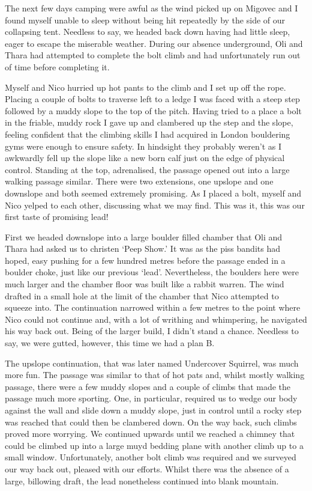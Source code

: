 The next few days camping were awful as the wind picked up on Migovec
and I found myself unable to sleep without being hit repeatedly by the
side of our collapsing tent. Needless to say, we headed back down having
had little sleep, eager to escape the miserable weather. During our
absence underground, Oli and Thara had attempted to complete the bolt
climb and had unfortunately run out of time before completing it.

Myself and Nico hurried up hot pants to the climb and I set up off the
rope. Placing a couple of bolts to traverse left to a ledge I was faced
with a steep step followed by a muddy slope to the top of the pitch.
Having tried to a place a bolt in the friable, muddy rock I gave up and
clambered up the step and the slope, feeling confident that the climbing
skills I had acquired in London bouldering gyms were enough to ensure
safety. In hindsight they probably weren't as I awkwardly fell up the
slope like a new born calf just on the edge of physical control.
Standing at the top, adrenalised, the passage opened out into a large
walking passage similar. There were two extensions, one upslope and one
downslope and both seemed extremely promising. As I placed a bolt,
myself and Nico yelped to each other, discussing what we may find. This
was it, this was our first taste of promising lead!

First we headed downslope into a large boulder filled chamber that Oli
and Thara had asked us to christen `Peep Show.' It was as the piss
bandits had hoped, easy pushing for a few hundred metres before the
passage ended in a boulder choke, just like our previous `lead'.
Nevertheless, the boulders here were much larger and the chamber floor
was built like a rabbit warren. The wind drafted in a small hole at the
limit of the chamber that Nico attempted to squeeze into. The
continuation narrowed within a few metres to the point where Nico could
not continue and, with a lot of writhing and whimpering, he navigated
his way back out. Being of the larger build, I didn't stand a chance.
Needless to say, we were gutted, however, this time we had a plan B.

The upslope continuation, that was later named Undercover Squirrel, was
much more fun. The passage was similar to that of hot pats and, whilst
mostly walking passage, there were a few muddy slopes and a couple of
climbs that made the passage much more sporting. One, in particular,
required us to wedge our body against the wall and slide down a muddy
slope, just in control until a rocky step was reached that could then be
clambered down. On the way back, such climbs proved more worrying. We
continued upwards until we reached a chimney that could be climbed up
into a large muyd bedding plane with another climb up to a small window.
Unfortunately, another bolt climb was required and we surveyed our way
back out, pleased with our efforts. Whilst there was the absence of a
large, billowing draft, the lead nonetheless continued into blank
mountain.

